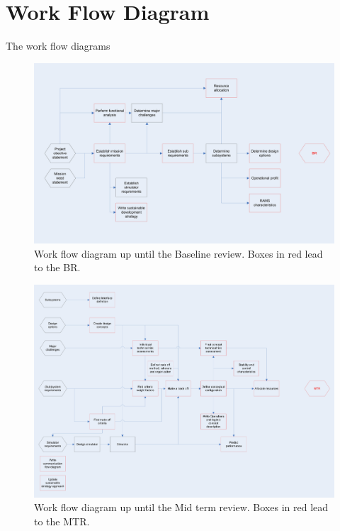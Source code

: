 \section{Work Flow Diagram}
\label{dsePPWFD}
The work flow diagrams

\newpage
\begin{figure}[H]
\begin{center}
\includegraphics[width=1.2\textwidth, angle=90]{chapters/img/Workflow_diagram_BR.jpg}
\end{center}
\caption{Work flow diagram up until the Baseline review. Boxes in red lead to the BR.}
\end{figure}

\newpage
\begin{figure}[H]
\begin{center}
\includegraphics[width=1.2\textwidth, angle=90]{chapters/img/Workflow_diagram_MTR.jpg}
\end{center}
\caption{Work flow diagram up until the Mid term review. Boxes in red lead to the MTR.}
\end{figure}

